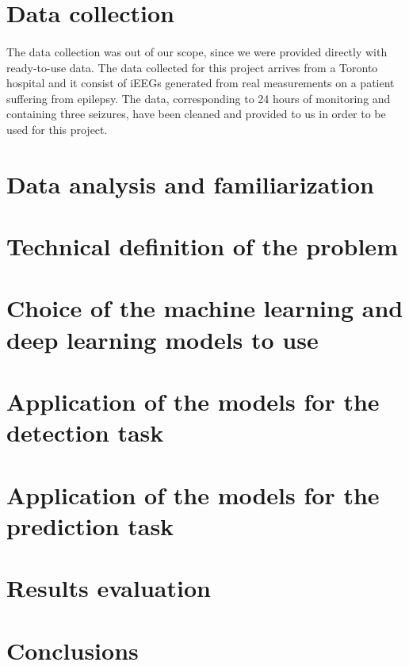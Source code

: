 \section{Data collection}
\paragraph{} The data collection was out of our scope, since we were provided directly with ready-to-use data. The data collected for this project arrives from a Toronto hospital and it consist of iEEGs generated from real measurements on a patient suffering from epilepsy. The data, corresponding to 24 hours of monitoring and containing three seizures, have been cleaned and provided to us in order to be used for this project.

\section{Data analysis and familiarization}
\section{Technical definition of the problem}
\section{Choice of the machine learning and deep learning models to use}
\section{Application of the models for the detection task}
\section{Application of the models for the prediction task}
\section{Results evaluation}
\section{Conclusions}
